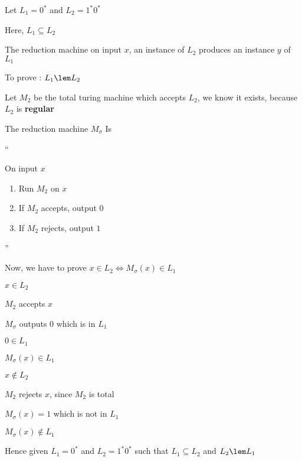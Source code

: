


Let $L_1 = 0^*$ and $L_2 = 1^*0^*$

Here, $L_1 \subseteq L_2$

The reduction machine on input $x$, an instance of $L_2$ produces an instance $y$ of $L_1$

To prove : $L_1 \lem L_2$

Let $M_2$ be the total turing machine which accepts $L_2$, we know it exists, because $L_2$ is \textbf{regular}

The reduction machine $M_\sigma$ Is

``

On input $x$
\begin{enumerate}
    \item Run $M_2$ on $x$
    \item If $M_2$ accepts, output $0$
    \item If $M_2$ rejects, output $1$
\end{enumerate}

''

Now, we have to prove
$x \in L_2 \Leftrightarrow M_\sigma(x) \in L_1$

$x \in L_2$

\imp
$M_2$ accepts $x$

\imp
$M_\sigma$ outputs $0$ which is in $L_1$

\imp
$0 \in L_1$

\imp
$M_\sigma(x) \in L_1$


$x \notin L_2$

\imp
$M_2$ rejects $x$, since $M_2$ is total

\imp
$M_\sigma(x) = 1$ which is not in $L_1$

\imp
$M_\sigma(x) \notin L_1$


Hence given $L_1 = 0^*$ and $L_2 = 1^*0^*$ such that $L_1 \subseteq L_2$ and $L_2 \lem L_1$
















